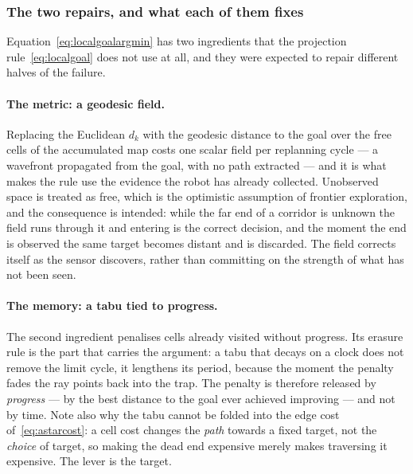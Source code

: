 \documentclass[11pt,a4paper]{article}
\begin{document}
\subsubsection{The two repairs, and what each of them fixes}
\label{sec:memoryfix}

Equation~\eqref{eq:localgoalargmin} has two ingredients that the projection rule~\eqref{eq:localgoal} does
not use at all, and they were expected to repair different halves of the failure.

\paragraph{The metric: a geodesic field.} Replacing the Euclidean $d_k$ with the geodesic distance to the
goal over the free cells of the accumulated map costs one scalar field per replanning cycle --- a wavefront
propagated from the goal, with no path extracted --- and it is what makes the rule use the evidence the robot
has already collected. Unobserved space is treated as free, which is the optimistic assumption of frontier
exploration, and the consequence is intended: while the far end of a corridor is unknown the field runs
through it and entering is the correct decision, and the moment the end is observed the same target becomes
distant and is discarded. The field corrects itself as the sensor discovers, rather than committing on the
strength of what has not been seen.

\paragraph{The memory: a tabu tied to progress.} The second ingredient penalises cells already visited
without progress. Its erasure rule is the part that carries the argument: a tabu that decays on a clock does
not remove the limit cycle, it lengthens its period, because the moment the penalty fades the ray points back
into the trap. The penalty is therefore released by \emph{progress} --- by the best distance to the goal ever
achieved improving --- and not by time. Note also why the tabu cannot be folded into the edge cost
of~\eqref{eq:astarcost}: a cell cost changes the \emph{path} towards a fixed target, not the \emph{choice} of
target, so making the dead end expensive merely makes traversing it expensive. The lever is the target.
\end{document}
